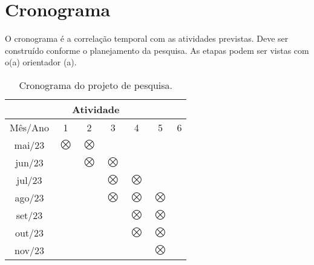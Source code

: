 
\chapter{Cronograma}

O cronograma é a correlação temporal com as atividades previstas. Deve ser construído conforme o planejamento da pesquisa. As etapas podem ser vistas com o(a) orientador (a).


\begin{table}
\caption{Cronograma do projeto de pesquisa.}
\label{tab:cronograma}
\centering
\begin{tabular}{|ccccccc|}
\hline
\multicolumn{7}{|c|}{Atividade}                                                                                                                               \\ \hline
\multicolumn{1}{|l|}{Mês/Ano} & \multicolumn{1}{c|}{1} & \multicolumn{1}{c|}{2} & \multicolumn{1}{c|}{3} & \multicolumn{1}{c|}{4} & \multicolumn{1}{c|}{5} & 6 \\ \hline
    \multicolumn{1}{|c|}{mai/23} & \multicolumn{1}{c|}{$\bigotimes$} & \multicolumn{1}{c|}{$\bigotimes$} & \multicolumn{1}{c|}{}  & \multicolumn{1}{c|}{}  & \multicolumn{1}{c|}{}  &   \\ \hline
    \multicolumn{1}{|c|}{jun/23} & \multicolumn{1}{c|}{}  & \multicolumn{1}{c|}{$\bigotimes$} & \multicolumn{1}{c|}{$\bigotimes$} & \multicolumn{1}{c|}{}  & \multicolumn{1}{c|}{}  &   \\ \hline
    \multicolumn{1}{|c|}{jul/23} & \multicolumn{1}{c|}{}  & \multicolumn{1}{c|}{}  & \multicolumn{1}{c|}{$\bigotimes$} & \multicolumn{1}{c|}{$\bigotimes$} & \multicolumn{1}{c|}{}  &   \\ \hline
    \multicolumn{1}{|c|}{ago/23}  & \multicolumn{1}{c|}{}  & \multicolumn{1}{c|}{}  & \multicolumn{1}{c|}{$\bigotimes$} & \multicolumn{1}{c|}{$\bigotimes$} & \multicolumn{1}{c|}{$\bigotimes$} &   \\ \hline
    \multicolumn{1}{|c|}{set/23} & \multicolumn{1}{c|}{}  & \multicolumn{1}{c|}{}  & \multicolumn{1}{c|}{}  & \multicolumn{1}{c|}{$\bigotimes$} & \multicolumn{1}{c|}{$\bigotimes$} &   \\ \hline
    \multicolumn{1}{|c|}{out/23} & \multicolumn{1}{c|}{}  & \multicolumn{1}{c|}{}  & \multicolumn{1}{c|}{}  & \multicolumn{1}{c|}{$\bigotimes$} & \multicolumn{1}{c|}{$\bigotimes$} &   \\ \hline
    \multicolumn{1}{|c|}{nov/23} & \multicolumn{1}{c|}{}  & \multicolumn{1}{c|}{}  & \multicolumn{1}{c|}{}  & \multicolumn{1}{c|}{}  & \multicolumn{1}{c|}{$\bigotimes$} &   \\ \hline

\end{tabular}
\end{table}
